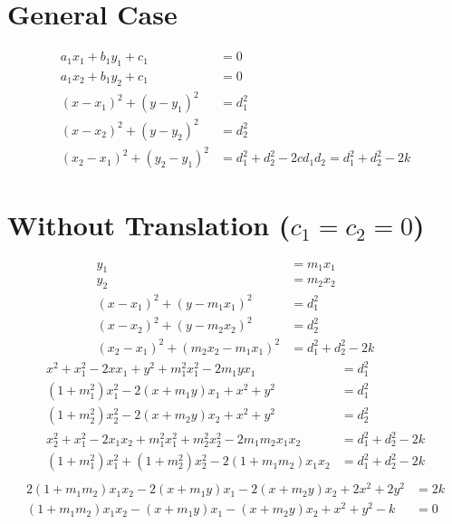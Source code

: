 \documentclass[11pt]{article}
\begin{document}
\section{General Case}
\begin{align*}
  a_1 x_1 + b_1 y_1 + c_1 &= 0\\
  a_1 x_2 + b_1 y_2 + c_1 &= 0\\
  (x - x_1)^2 + (y - y_1)^2 &= d_1^2\\
  (x - x_2)^2 + (y - y_2)^2 &= d_2^2\\
  (x_2 - x_1)^2 + (y_2 - y_1)^2 &= d_1^2 + d_2^2 - 2 c d_1 d_2 = d_1^2 + d_2^2 - 2 k
\end{align*}
\section{Without Translation ($c_1 = c_2 = 0$)}
\begin{align*}
  y_1 & = m_1 x_1\\
  y_2 & = m_2 x_2\\
  (x - x_1)^2 + (y - m_1 x_1)^2 & = d_1^2\\
  (x - x_2)^2 + (y - m_2 x_2)^2 & = d_2^2\\
  (x_2 - x_1)^2 + (m_2 x_2 - m_1 x_1)^2 & = d_1^2 + d_2^2 - 2 k
\end{align*}
\begin{align*}
  x^2 + x_1^2 - 2 x x_1 + y^2 + m_1^2x_1^2 - 2 m_1 y x_1 &= d_1^2\\
  (1 + m_1^2) x_1^2 - 2 (x + m_1 y) x_1  + x^2 + y^2  &= d_1^2\\
  (1 + m_2^2) x_2^2 - 2 (x + m_2 y) x_2  + x^2 + y^2  &= d_2^2\\
  x_2^2 + x_1^2 - 2 x_1 x_2 + m_1^2 x_1^2 + m_2^2 x_2^2 - 2 m_1 m_2 x_1 x_2 &= d_1^2 + d_2^2 - 2 k\\
  (1 + m_1^2) x_1^2 + (1 + m_2^2) x_2^2 - 2 (1 + m_1 m_2) x_1 x_2 &= d_1^2 + d_2^2 - 2 k\\
\end{align*}
\begin{align*}
  2 (1 + m_1 m_2) x_1 x_2 - 2 (x + m_1 y) x_1 - 2 (x + m_2 y) x_2 + 2 x^2 + 2 y^2 &= 2 k\\
  (1 + m_1 m_2) x_1 x_2 - (x + m_1 y) x_1 - (x + m_2 y) x_2 + x^2 + y^2 - k &= 0\\
\end{align*}
\end{document}

